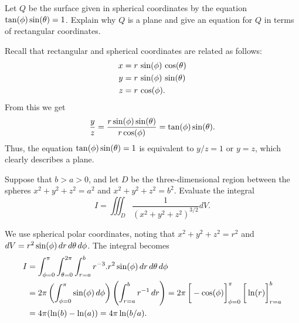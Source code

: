 \documentclass[a4paper]{amsart}
\renewenvironment{solution}{\SolutionInline}{\endSolutionInline}
\begin{document}
\begin{exercise}
 Let $Q$ be the surface given in spherical coordinates by the equation
 $\tan(\phi)\sin(\theta)=1$.  Explain why $Q$ is a plane and give an
 equation for $Q$ in terms of rectangular coordinates.
\end{exercise}
\begin{solution}
 Recall that rectangular and spherical coordinates are related as
 follows:
 \begin{align*}
  x &= r \, \sin(\phi)\,\cos(\theta) \\
  y &= r \, \sin(\phi)\,\sin(\theta) \\
  z &= r \, \cos(\phi).
 \end{align*}
 From this we get 
 \[ \frac{y}{z} = 
    \frac{r\sin(\phi)\sin(\theta)}{r\cos(\phi)} = 
    \tan(\phi)\sin(\theta).
 \]
 Thus, the equation $\tan(\phi)\sin(\theta)=1$ is equivalent to $y/z=1$
 or $y=z$, which clearly describes a plane.
\end{solution}

\begin{exercise}
 Suppose that $b>a>0$, and let $D$ be the three-dimensional region
 between the spheres $x^2+y^2+z^2=a^2$ and $x^2+y^2+z^2=b^2$.
 Evaluate the integral
 \[ I = \iiint_D \frac{1}{(x^2+y^2+z^2)^{3/2}} dV. \]
\end{exercise}
\begin{solution}
 We use spherical polar coordinates, noting that $x^2+y^2+z^2=r^2$ and
 $dV=r^2\sin(\phi)\,dr\,d\theta\,d\phi$.  The integral becomes
 \begin{align*}
  I &= \int_{\phi=0}^\pi \int_{\tht=0}^{2\pi} \int_{r=a}^b 
        r^{-3}.r^2\sin(\phi)\,dr\,d\tht\,d\phi \\
    &= 2\pi \left(\int_{\phi=0}^\pi\sin(\phi)\,d\phi\right)
            \left(\int_{r=a}^b r^{-1}\,dr\right) 
     = 2\pi \CH{-\cos(\phi)}_{\phi=0}^\pi 
            \CH{\ln(r)}_{r=a}^b \\
    &= 4\pi(\ln(b)-\ln(a)) = 4\pi\ln(b/a).
 \end{align*}
\end{solution}
\end{document}
